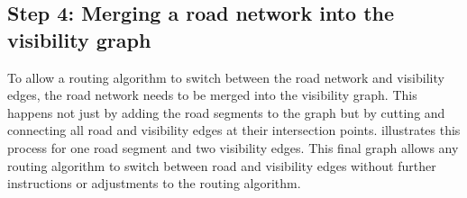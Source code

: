 	\subsection{Step 4: Merging a road network into the visibility graph}
	\label{subsec:step-4-graph merging}
	
		To allow a routing algorithm to switch between the road network and visibility edges, the road network needs to be merged into the visibility graph.
		This happens not just by adding the road segments to the graph but by cutting and connecting all road and visibility edges at their intersection points.
		 illustrates this process for one road segment and two visibility edges.
		This final graph allows any routing algorithm to switch between road and visibility edges without further instructions or adjustments to the routing algorithm.
		
